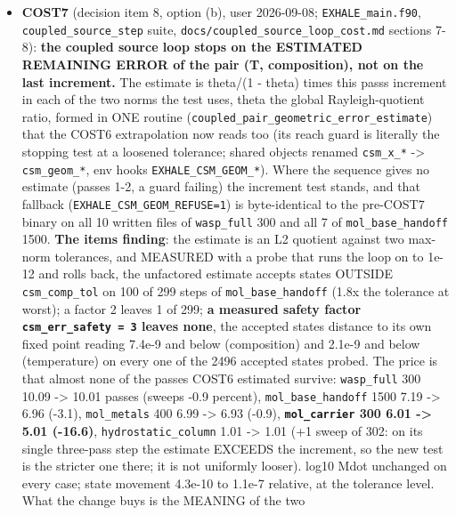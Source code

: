 \documentclass[english,a4paper]{my_memo}
\begin{document}
\begin{itemize}
  runs end with status 2, "not certified", exactly as the golden runs do).
\item
  \textbf{COST7} (decision item 8, option (b), user 2026-09-08; \texttt{EXHALE\_main.f90},
  \texttt{coupled\_source\_step} suite, \texttt{docs/coupled\_source\_loop\_cost.md} sections
  7-8): \textbf{the coupled source loop stops on the ESTIMATED REMAINING ERROR of
  the pair (T, composition), not on the last increment.} The estimate is
  \textbar theta/(1 - theta)\textbar{} times this pass\textquotesingle s increment in each of the two norms
  the test uses, theta the global Rayleigh-quotient ratio, formed in ONE
  routine (\texttt{coupled\_pair\_geometric\_error\_estimate}) that the COST6
  extrapolation now reads too (its reach guard is literally the stopping
  test at a loosened tolerance; shared objects renamed \texttt{csm\_x\_*} -\textgreater{}
  \texttt{csm\_geom\_*}, env hooks \texttt{EXHALE\_CSM\_GEOM\_*}). Where the sequence gives no
  estimate (passes 1-2, a guard failing) the increment test stands, and
  that fallback (\texttt{EXHALE\_CSM\_GEOM\_REFUSE=1}) is byte-identical to the
  pre-COST7 binary on all 10 written files of \texttt{wasp\_full} 300 and all 7 of
  \texttt{mol\_base\_handoff} 1500. \textbf{The item\textquotesingle s finding}: the estimate is an L2
  quotient against two max-norm tolerances, and MEASURED with a probe that
  runs the loop on to 1e-12 and rolls back, the unfactored estimate accepts
  states OUTSIDE \texttt{csm\_comp\_tol} on 100 of 299 steps of \texttt{mol\_base\_handoff}
  (1.8x the tolerance at worst); a factor 2 leaves 1 of 299; \textbf{a measured
  safety factor \texttt{csm\_err\_safety\ =\ 3} leaves none}, the accepted state\textquotesingle s
  distance to its own fixed point reading 7.4e-9 and below (composition)
  and 2.1e-9 and below (temperature) on every one of the 2496 accepted
  states probed. The price is that almost none of the passes COST6
  estimated survive: \texttt{wasp\_full} 300 10.09 -\textgreater{} 10.01 passes (sweeps -0.9
  percent), \texttt{mol\_base\_handoff} 1500 7.19 -\textgreater{} 6.96 (-3.1), \texttt{mol\_metals} 400
  6.99 -\textgreater{} 6.93 (-0.9), \textbf{\texttt{mol\_carrier} 300 6.01 -\textgreater{} 5.01 (-16.6)},
  \texttt{hydrostatic\_column} 1.01 -\textgreater{} 1.01 (+1 sweep of 302: on its single
  three-pass step the estimate EXCEEDS the increment, so the new test is
  the stricter one there; it is not uniformly looser). log10 Mdot unchanged
  on every case; state movement 4.3e-10 to 1.1e-7 relative, at the
  tolerance level. What the change buys is the MEANING of the two

\end{itemize}
\end{document}
